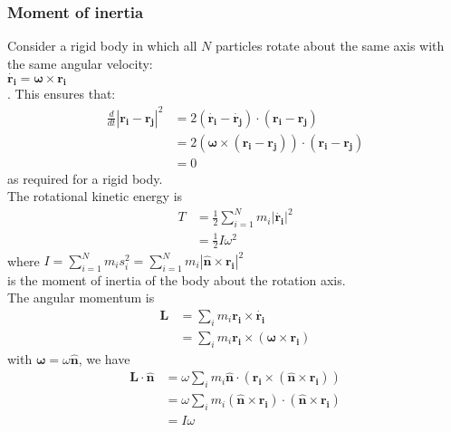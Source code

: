 \documentclass[a4paper]{article}
\begin{document}
\subsubsection{Moment of inertia}
Consider a rigid body in which all $N$ particles rotate about the same axis with the same angular velocity:\\
$\dot{\mathbf{r_i}}=\mathbf{\omega}\times\mathbf{r_i}$\\.
This ensures that:
\begin{equation*}
\begin{aligned}
\frac{d}{dt}|\mathbf{r_i}-\mathbf{r_j}|^2 &= 2\left(\mathbf{\dot{r_i}}-\mathbf{\dot{r_j}}\right)\cdot\left(\mathbf{r_i}-\mathbf{r_j}\right)\\
&=2\left(\mathbf{\omega}\times\left(\mathbf{r_i}-\mathbf{r_j}\right)\right)\cdot\left(\mathbf{r_i}-\mathbf{r_j}\right)\\
&=0
\end{aligned}
\end{equation*}
as required for a rigid body.\\
The rotational kinetic energy is\\
\begin{equation*}
\begin{aligned}
T &= \frac{1}{2}\sum_{i=1}^N m_i |\dot{\mathbf{r_i}}|^2\\
&= \frac{1}{2}I\omega^2
\end{aligned}
\end{equation*}
where $I=\sum_{i=1}^N m_i s_i^2=\sum_{i=1}^N m_i |\hat{\mathbf{n}}\times\mathbf{r_i}|^2$\\
is the moment of inertia of the body about the rotation axis.\\
The angular momentum is
\begin{equation*}
\begin{aligned}
\mathbf{L}&=\sum_i m_i \mathbf{r_i}\times \dot{\mathbf{r_i}}\\
&= \sum_i m_i \mathbf{r_i}\times\left(\mathbf{\omega}\times\mathbf{r_i}\right)
\end{aligned}
\end{equation*}
with $\mathbf{\omega} = \omega \hat{\mathbf{n}}$, we have
\begin{equation*}
\begin{aligned}
\mathbf{L}\cdot\hat{\mathbf{n}}&=\omega \sum_i m_i \hat{\mathbf{n}}\cdot\left(\mathbf{r_i}\times\left(\hat{\mathbf{n}}\times\mathbf{r_i}\right)\right)\\
&= \omega \sum_i m_i \left(\hat{\mathbf{n}}\times\mathbf{r_i}\right)\cdot\left(\hat{\mathbf{n}}\times\mathbf{r_i}\right)\\
&= I\omega
\end{aligned}
\end{equation*}
\end{document}
